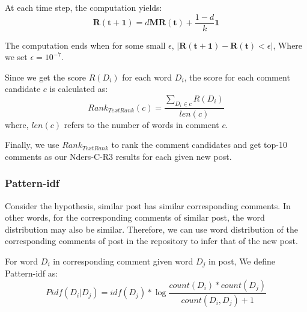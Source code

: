 \documentclass{sig-alternate}
\begin{document}
At each time step, the computation yields:
\begin{equation}
  \bm{R(t+1)} = d\bm{M}\bm{R(t)} + \frac{1-d}{k} \bm{1}
\end{equation}

The computation ends when for some small $\epsilon$, $|\bm{R(t+1)} - \bm{R(t)} < \epsilon|$, Where we set $\epsilon = 10^{-7}$.

Since we get the score $R(D_i)$ for each word $D_i$, the score for each comment candidate $c$ is calculated as:
\begin{equation}
  Rank_{TextRank}(c) = \frac{\sum_{D_i \in c}{R(D_i)}}{len(c)} 
\end{equation}
where, $len(c)$ refers to the number of words in comment $c$.

Finally, we use $Rank_{TextRank}$ to rank the comment candidates and get top-10 comments as our Nders-C-R3 results for each given new post.

\subsubsection{Pattern-idf}
Consider the hypothesis, similar post has similar corresponding comments. In 
other words, for the corresponding comments of similar post, the word 
distribution may also be similar. Therefore, we can use word distribution of 
the corresponding comments of post in the repository to infer that of the new post.


For word $D_i$ in corresponding comment given word $D_j$ in post, We define Pattern-idf as:
\begin{equation}
  Pidf(D_i|D_j) = idf(D_j) * \log{\frac{count(D_i) * count(D_j)}{count(D_i, D_j) + 1}}
\end{equation}
\end{document}
